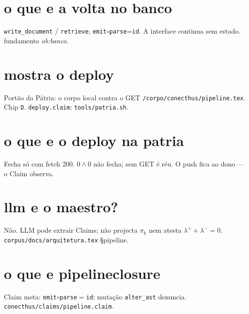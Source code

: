 \documentclass[11pt,a4paper]{article}
\newcommand{\code}[1]{\texttt{\small #1}}
\begin{document}
\section{o que e a volta no banco}
\code{write\_document} / \code{retrieve}; \code{emit}$\circ$\code{parse}=\code{id}.
A interface continua sem estado. fundamento \emph{ob:banco}.

\section{mostra o deploy}
Portão da Pátria: o corpo local contra o GET
\code{/corpo/conecthus/pipeline.tex}. Chip \code{D}.
\code{deploy.claim}; \code{tools/patria.sh}.

\section{o que e o deploy na patria}
Fecha só com fetch 200. $0\wedge0$ não fecha; sem GET é réu.
O push fica ao dono --- o Claim observa.

\section{llm e o maestro?}
Não. LLM pode extrair Claims; não projecta $\pi_k$ nem atesta
$\lambda^{+}+\lambda^{-}=0$. \code{corpus/docs/arquitetura.tex} \S pipeline.

\section{o que e pipelineclosure}
Claim meta: \code{emit}$\circ$\code{parse}$=$\code{id}; mutação
\code{alter\_ast} denuncia. \code{conecthus/claims/pipeline.claim}.
\end{document}
